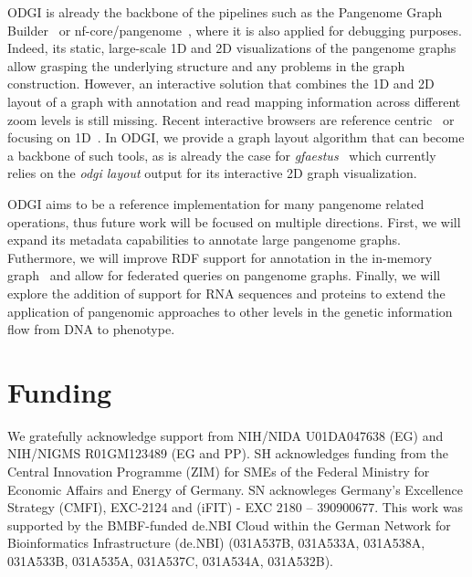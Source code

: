 \documentclass{bioinfo}
\begin{document}
ODGI is already the backbone of the pipelines such as the Pangenome Graph Builder~\citep{pggb} or nf-core/pangenome~\citep{pangenome}, where it is also applied for debugging purposes. %
Indeed, its static, large-scale 1D and 2D visualizations of the pangenome graphs allow grasping the underlying structure and any problems in the graph construction.
However, an interactive solution that combines the 1D and 2D layout of a graph with annotation and read mapping information across different zoom levels is still missing.
Recent interactive browsers are reference centric~\citep{Beyer2019, Yokoyama2019, Durant2021, Liang2021} or focusing on 1D~\citep{Wick_2015, Gonnella2018}.
In ODGI, we provide a graph layout algorithm that can become a backbone of such tools, as is already the case for \textit{gfaestus}~\citep{gfaestus} %
which currently relies on the \textit{odgi layout} output for its interactive 2D graph visualization.

ODGI aims to be a reference implementation for many pangenome related operations, thus future work will be focused on multiple directions.
First, we will expand its metadata capabilities to annotate large pangenome graphs.
Futhermore, we will improve RDF support for annotation in the in-memory graph~\citep{Yokoyama2020} and allow for federated queries on pangenome graphs.
Finally, we will explore the addition of support for RNA sequences and proteins to extend the application of pangenomic approaches to other levels in the genetic information flow from DNA to phenotype.








\section*{Funding}

We gratefully acknowledge support from NIH/NIDA U01DA047638 (EG) and NIH/NIGMS R01GM123489 (EG and PP).
SH acknowledges funding from the Central Innovation Programme (ZIM) for SMEs of the Federal Ministry for Economic Affairs and Energy of Germany. SN acknowleges Germany’s Excellence Strategy (CMFI), EXC-2124 and (iFIT) - EXC 2180 – 390900677.
This work was supported by the BMBF-funded de.NBI Cloud within the German Network for Bioinformatics Infrastructure (de.NBI) (031A537B, 031A533A, 031A538A, 031A533B, 031A535A, 031A537C, 031A534A, 031A532B).
\end{document}
